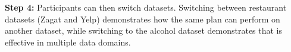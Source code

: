 \vspace{0.2em}

\noindent\textbf{Step 4: } Participants can then switch datasets. Switching between restaurant datasets (Zagat and Yelp) demonstrates how the same plan can perform on another dataset, while switching to the alcohol dataset demonstrates that \sys is effective in multiple data domains.

